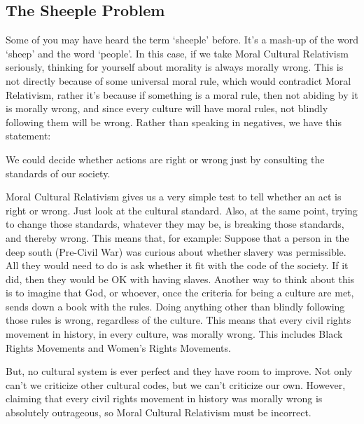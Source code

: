 \subsection{The Sheeple Problem}

Some of you may have heard the term `sheeple' before. It's a mash-up of the word `sheep' and the word `people'. In this case, if we take Moral Cultural Relativism seriously, thinking for yourself about morality is always morally wrong. This is not directly because of some universal moral rule, which would contradict Moral Relativism, rather it's because if something is a moral rule, then not abiding by it is morally wrong, and since every culture will have moral rules, not blindly following them will be wrong. Rather than speaking in negatives, we have this statement: 
\begin{center}
We could decide whether actions are right or wrong just by consulting the standards of our society.
\end{center}
Moral Cultural Relativism gives us a very simple test to tell whether an act is right or wrong. Just look at the cultural standard. Also, at the same point, trying to change those standards, whatever they may be, is breaking those standards, and thereby wrong. This means that, for example: Suppose that a person in the deep south (Pre-Civil War) was curious about whether slavery was permissible. All they would need to do is ask whether it fit with the code of the society. If it did, then they would be OK with having slaves. Another way to think about this is to imagine that God, or whoever, once the criteria for being a culture are met, sends down a book with the rules. Doing anything other than blindly following those rules is wrong, regardless of the culture. This means that every civil rights movement in history, in every culture, was morally wrong. This includes Black Rights Movements and Women's Rights Movements.

But, no cultural system is ever perfect and they have room to improve. Not only can’t we criticize other cultural codes, but we can’t criticize our own. However, claiming that every civil rights movement in history was morally wrong is absolutely outrageous, so Moral Cultural Relativism must be incorrect.  

